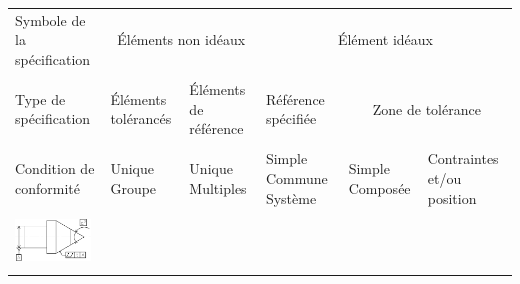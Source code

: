 \documentclass[11pt,oneside]{article}
\begin{document}
\begin{exemple}
\footnotesize{
\begin{center}
\begin{tabular}{|p{}|p{}|p{}|p{}|p{}|p{}|}
\hline
Symbole de la spécification & 
\multicolumn{2}{c|}{Éléments non idéaux} &
\multicolumn{3}{c|}{Élément idéaux} \\
&
\multicolumn{2}{c|}{} &
\multicolumn{3}{c|}{}\\
\hline
Type de spécification & 
Éléments tolérancés &
Éléments de référence & 
Référence spécifiée & 
\multicolumn{2}{c|}{Zone de tolérance} \\
&&&&
\multicolumn{2}{c|}{}\\
\hline
Condition de conformité & 
Unique Groupe & Unique Multiples &
Simple Commune Système &
Simple Composée & 
Contraintes et/ou position \\
\hline
\multirow{12}{*}{\includegraphics[width=2cm]{png/ex_battementt}}&&&&&\\
&&&&&\\
&&&&&\\
&&&&&\\
&&&&&\\
&&&&&\\
&&&&&\\
&&&&&\\
&&&&&\\
&&&&&\\
&&&&&\\
&&&&&\\
\hline
\end{tabular}
\end{center}
}
\end{exemple}



\end{document}
